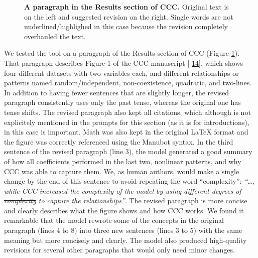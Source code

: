 \documentclass[
]{article}
\providecommand{\DIFaddbegin}{} %
\providecommand{\DIFaddend}{} %
\providecommand{\DIFdelbegin}{} %
\providecommand{\DIFdelend}{} %
\providecommand{\DIFaddbeginFL}{} %
\providecommand{\DIFaddendFL}{} %
\providecommand{\DIFdelbeginFL}{} %
\providecommand{\DIFdelendFL}{} %
\newcommand{\DIFscaledelfig}{0.5}
\newlength{\DIFdelgraphicswidth} %
\newlength{\DIFdelgraphicsheight} %
\newcommand{\DIFaddincludegraphics}[2][]{{\color{blue}\fbox{\DIFOincludegraphics[#1]{#2}}}} %
\newcommand{\DIFdelincludegraphics}[2][]{%
\sbox{\DIFdelgraphicsbox}{\DIFOincludegraphics[#1]{#2}}%
\settoboxwidth{\DIFdelgraphicswidth}{\DIFdelgraphicsbox} %
\settoboxtotalheight{\DIFdelgraphicsheight}{\DIFdelgraphicsbox} %
\scalebox{\DIFscaledelfig}{%
\parbox[b]{\DIFdelgraphicswidth}{\usebox{\DIFdelgraphicsbox}\\[-\baselineskip] \rule{\DIFdelgraphicswidth}{0em}}\llap{\resizebox{\DIFdelgraphicswidth}{\DIFdelgraphicsheight}{%
\setlength{\unitlength}{\DIFdelgraphicswidth}%
\begin{picture}(1,1)%
\thicklines\linethickness{2pt} %
{\color[rgb]{1,0,0}\put(0,0){\framebox(1,1){}}}%
{\color[rgb]{1,0,0}\put(0,0){\line( 1,1){1}}}%
{\color[rgb]{1,0,0}\put(0,1){\line(1,-1){1}}}%
\end{picture}%
}\hspace*{3pt}}} %
} %
\DeclareRobustCommand{\DIFaddbegin}{\DIFOaddbegin \let\includegraphics\DIFaddincludegraphics} %
\DeclareRobustCommand{\DIFaddend}{\DIFOaddend \let\includegraphics\DIFOincludegraphics} %
\DeclareRobustCommand{\DIFdelbegin}{\DIFOdelbegin \let\includegraphics\DIFdelincludegraphics} %
\DeclareRobustCommand{\DIFdelend}{\DIFOaddend \let\includegraphics\DIFOincludegraphics} %
\DeclareRobustCommand{\DIFaddbeginFL}{\DIFOaddbeginFL \let\includegraphics\DIFaddincludegraphics} %
\DeclareRobustCommand{\DIFaddendFL}{\DIFOaddendFL \let\includegraphics\DIFOincludegraphics} %
\DeclareRobustCommand{\DIFdelbeginFL}{\DIFOdelbeginFL \let\includegraphics\DIFdelincludegraphics} %
\DeclareRobustCommand{\DIFdelendFL}{\DIFOaddendFL \let\includegraphics\DIFOincludegraphics} %
\begin{document}
\begin{figure}
\DIFdelbeginFL %
\DIFdelendFL \DIFaddbeginFL \hypertarget{fig:results:ccc}{%
\centering

\caption{\textbf{A paragraph in the Results section of CCC.}
Original text is on the left and suggested revision on the right.
Single words are not underlined/highlighed in this case because the revision completely overhauled the text.}\label{fig:results:ccc}
}
\DIFaddendFL \end{figure}

We tested the tool on a paragraph of the Results section of CCC (Figure \ref{fig:results:ccc}).
That paragraph describes Figure 1 of the CCC manuscript {[}\protect\DIFdelbegin %
\DIFdelend \DIFaddbegin \hyperlink{ref-eirYTTyk}{14}{]}\DIFaddend , which shows four different datasets with two variables each, and different relationships or patterns named random/independent, non-coexistence, quadratic, and two-lines.
In addition to having fewer sentences that are slightly longer, the revised paragraph consistently uses only the past tense, whereas the original one has tense shifts.
The revised paragraph also kept all citations, which although is not explicitely mentioned in the prompts for this section (as it is for introductions), in this case is important.
Math was also kept in the original LaTeX format and the figure was correctly referenced using the Manubot syntax.
In the third sentence of the revised paragraph (line 3), the model generated a good summary of how all coefficients performed in the last two, nonlinear patterns, and why CCC was able to capture them.
We, as human authors, would make a single change by the end of this sentence to avoid repeating the word ``complexity'': \emph{``\ldots, while CCC increased the complexity of the model \sout{by using different degrees of complexity} to capture the relationships''}.
The revised paragraph is more concise and clearly describes what the figure shows and how CCC works.
We found it remarkable that the model rewrote some of the concepts in the original paragraph (lines 4 to 8) into three new sentences (lines 3 to 5) with the same meaning but more concisely and clearly.
The model also produced high-quality revisions for several other paragraphs that would only need minor changes.
\end{document}
